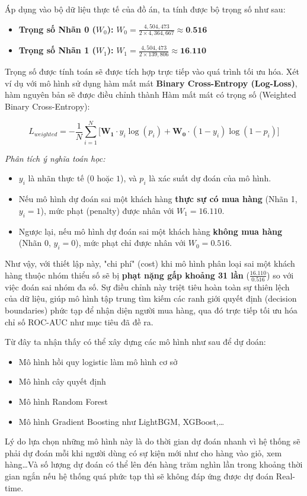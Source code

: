 \documentclass[a4paper,11pt]{article}
\begin{document}
Áp dụng vào bộ dữ liệu thực tế của đồ án, ta tính được bộ trọng số như sau:
\begin{itemize}
    \item \textbf{Trọng số Nhãn 0 ($W_0$):} $W_0 = \frac{4,504,473}{2 \times 4,364,667} \approx \textbf{0.516}$
    \item \textbf{Trọng số Nhãn 1 ($W_1$):} $W_1 = \frac{4,504,473}{2 \times 139,806} \approx \textbf{16.110}$
\end{itemize}

Trọng số được tính toán sẽ được tích hợp trực tiếp vào quá trình tối ưu hóa. Xét ví dụ với mô hình sử dụng hàm mất mát \textbf{Binary Cross-Entropy (Log-Loss)}, hàm nguyên bản sẽ được điều chỉnh thành Hàm mất mát có trọng số (Weighted Binary Cross-Entropy):

$$ L_{weighted} = -\frac{1}{N} \sum_{i=1}^{N} \Big[ \mathbf{W_1} \cdot y_i \log(p_i) + \mathbf{W_0} \cdot (1 - y_i) \log(1 - p_i) \Big] $$

\textit{Phân tích ý nghĩa toán học:}
\begin{itemize}
    \item $y_i$ là nhãn thực tế ($0$ hoặc $1$), và $p_i$ là xác suất dự đoán của mô hình.
    \item Nếu mô hình dự đoán sai một khách hàng \textbf{thực sự có mua hàng} (Nhãn 1, $y_i = 1$), mức phạt (penalty) được nhân với $W_1 = 16.110$.
    \item Ngược lại, nếu mô hình dự đoán sai một khách hàng \textbf{không mua hàng} (Nhãn 0, $y_i = 0$), mức phạt chỉ được nhân với $W_0 = 0.516$.
\end{itemize}
Như vậy, với thiết lập này, "chi phí" (cost) khi mô hình phân loại sai một khách hàng thuộc nhóm thiểu số sẽ bị \textbf{phạt nặng gấp khoảng 31 lần} ($\frac{16.110}{0.516}$) so với việc đoán sai nhóm đa số. Sự điều chỉnh này triệt tiêu hoàn toàn sự thiên lệch của dữ liệu, giúp mô hình tập trung tìm kiếm các ranh giới quyết định (decision boundaries) phức tạp để nhận diện người mua hàng, qua đó trực tiếp tối ưu hóa chỉ số ROC-AUC như mục tiêu đã đề ra.

Từ đây ta nhận thấy có thể xây dựng các mô hình như sau để dự doán:
\begin{itemize}
    \item Mô hình hồi quy logistic làm mô hình cơ sở
    \item Mô hình cây quyết định
    \item Mô hình Random Forest
    \item Mô hình Gradient Boosting như LightBGM, XGBoost,\dots
\end{itemize}
Lý do lựa chọn những mô hình này là do thời gian dự đoán nhanh vì hệ thống sẽ phải dự đoán mỗi khi người dùng có sự kiện
mới như cho hàng vào giỏ, xem hàng\dots Và số lượng dự đoán có thể lên đén hàng trăm nghìn lần trong khoảng thời gian ngắn nếu hệ thống quá phức tạp 
thì sẽ không đáp ứng được dự đoán Real-time.
\end{document}
